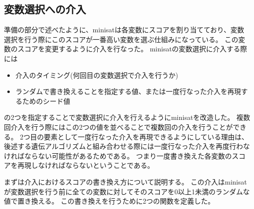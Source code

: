 \subsection{変数選択への介入}






準備の部分で述べたように、minisatは各変数にスコアを割り当てており、変数選択を行う際にこのスコアが一番高い変数を選ぶ仕組みになっている。
この変数のスコアを変更するように介入を行なった。
minisatの変数選択に介入する際には
\begin{itemize}
	\item 介入のタイミング(何回目の変数選択で介入を行うか)
	\item ランダムで書き換えることを指定する値、または一度行なった介入を再現するためのシード値
\end{itemize}
の2つを指定することで変数選択に介入を行えるようにminisatを改造した。
複数回介入を行う際にはこの2つの値を並べることで複数回の介入を行うことができる。
2つ目の要素として一度行なった介入を再現できるようにしている理由は、
後述する遺伝アルゴリズムと組み合わせる際には一度行なった介入を再度行わなければならない可能性があるためである。
つまり一度書き換えた各変数のスコアを再現しなければならないということである。

まずは介入におけるスコアの書き換え方について説明する。
この介入はminisatが変数選択を行う前に全ての変数に対してそのスコアを0以上1未満のランダムな値で置き換える。
この書き換えを行うために2つの関数を定義した。

